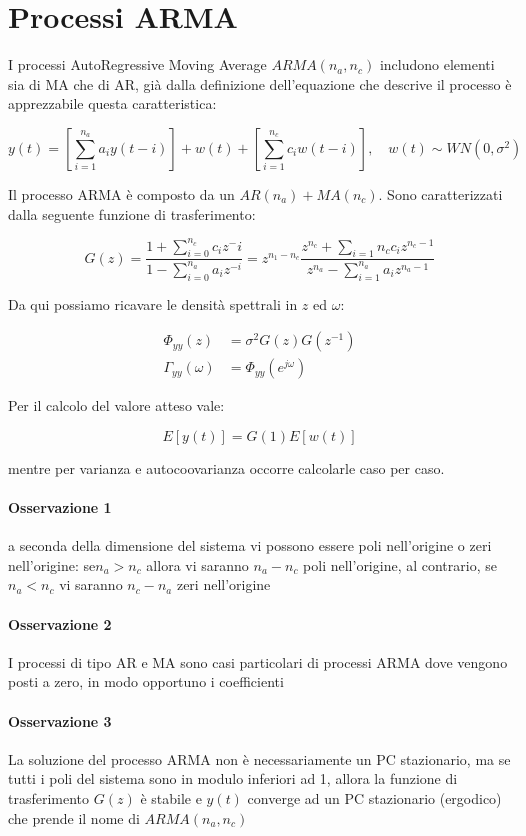 \section{Processi ARMA}
I processi AutoRegressive Moving Average $ARMA(n_a,n_c)$ includono elementi sia di MA che di AR, già dalla definizione dell'equazione che descrive il processo è apprezzabile questa caratteristica:

  \[ y(t)=\left[ \sum_{i=1}^{n_a}{a_iy(t-i)}\right]+w(t)+\left[ \sum_{i=1}^{n_c}{c_iw(t-i)}\right], \quad w(t) \sim WN(0,\sigma^2)  \]  

Il processo ARMA è composto da un $AR(n_a)+MA(n_c)$. Sono caratterizzati dalla seguente funzione di trasferimento:

  \[ G(z)=\frac{1+\sum_{i=0}^{n_c}{c_iz^-{i}}}{1-\sum_{i=0}^{n_a}{a_iz^{-i}}}=z^{n_1-n_c}\frac{z^{n_c}+\sum_{i=1}{n_c}{c_iz^{n_c-1}}}{z^{n_a}-\sum_{i=1}^{n_a}{a_iz^{n_a-1}}} \]

Da qui possiamo ricavare le densità spettrali in $z$ ed $\omega$:

  \begin{align*}
    \Phi_{yy}(z)&=\sigma^2G(z)G(z^{-1})\\
    \Gamma_{yy}(\omega)&=\Phi_{yy}(e^{j\omega})
  \end{align*}  

Per il calcolo del valore atteso vale:

  \[ E[y(t)]=G(1)E[w(t)] \]
  
mentre per varianza e autocoovarianza occorre calcolarle caso per caso.

\paragraph{Osservazione 1} a seconda della dimensione del sistema vi possono essere poli nell'origine o zeri nell'origine: se$n_a>n_c$ allora vi saranno $n_a-n_c$ poli nell'origine, al contrario, se $n_a<n_c$ vi saranno $n_c-n_a$ zeri nell'origine
\paragraph{Osservazione 2} I processi di tipo AR e MA sono casi particolari di processi ARMA dove vengono posti a zero, in modo opportuno i coefficienti
\paragraph{Osservazione 3} La soluzione del processo ARMA non è necessariamente un PC stazionario, ma se tutti i poli del sistema sono in modulo inferiori ad 1, allora la funzione di trasferimento $G(z)$ è stabile e $y(t)$ converge ad un PC stazionario (ergodico) che prende il nome di $ARMA(n_a,n_c)$
